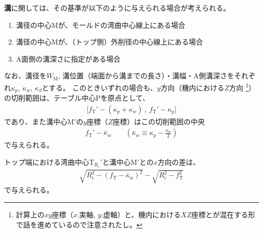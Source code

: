 


\textbf{溝}に関しては、その基準が以下のように与えられる場合が考えられる。
\begin{enumerate}
\item {}溝径の中心Mが、モールドの湾曲中心線上にある場合
\item {}溝径の中心Mが、（トップ側）外削径の中心線上にある場合
\item {}A面側の溝深さに指定がある場合
\end{enumerate}
なお、溝径を$W_\mathrm M$, 溝位置（端面から溝までの長さ）・溝幅・A側溝深さをそれぞれ$\kappa_p$, $\kappa_w$, $\kappa_d$とする。
このときいずれの場合も、$y$方向（機内における$Z$方向
\footnote{計算上の$xy$座標（$x$:実軸, $y$:虚軸）と、機内における$XZ$座標とが混在する形で話を進めているので注意されたし。}）
の切削範囲は、テーブル中心Pを原点として、
\begin{align*}
  \big[f_\mathrm T'-(\kappa_p+\kappa_w)\ ,\ f_\mathrm T'-\kappa_p\big]
\end{align*}
であり、また溝中心M$'$の$y$座標（$Z$座標）はこの切削範囲の中央
\begin{align}
  \label{eq:mizocenterZ}
  f_\mathrm T'-\bar\kappa_w \qquad
  \left(\bar\kappa_w \equiv \kappa_p-\frac{\kappa_w}2\right)
\end{align}
で与えられる。



トップ端における湾曲中心T$_{R_\mathrm c}'$と溝中心M$'$との$x$方向の差は、
\begin{align}
  \label{eq:difTopMizoCenter}
  \sqrt{R_\mathrm c^2-\left(f_\mathrm T-\bar\kappa_w\right)^{\!2}}
  -\sqrt{R_\mathrm c^2-f_\mathrm T^2}
\end{align}
で与えられる。


